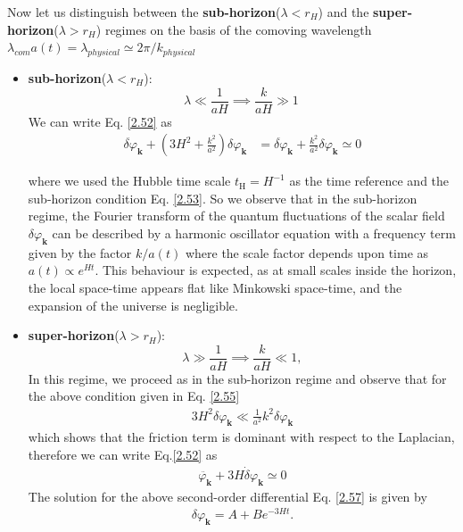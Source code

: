 Now let us distinguish between the \textbf{sub-horizon}($\lambda < r_H$) and the \textbf{super-horizon}($\lambda > r_H$) regimes on the basis of the comoving wavelength $\lambda_{com} a(t) = \lambda_{physical} \simeq 2\pi/k_{physical}$

\begin{itemize}
    \item  \textbf{sub-horizon}($\lambda < r_H$):\\
    \begin{equation}
        \lambda \ll \frac{1}{aH} \implies \frac{k}{aH} \gg 1\ \label{2.53}
    \end{equation}
    We can write Eq. \ref{2.52} as
    \begin{align}
        \ddot{ \delta \varphi} _{\mathbf{k}} + (3 H^2  + \frac{k^2}{a^2}) \delta \varphi _{\mathbf{k}} &=  \ddot{ \delta \varphi} _{\mathbf{k}} + \frac{k^2}{a^2} \delta \varphi _{\mathbf{k}} \simeq 0 \label{2.54}
    \end{align}  
    
    where we used the Hubble time scale \(t_{\mathrm{H}}=H^{-1}\) as the time reference and the sub-horizon condition Eq. \ref{2.53}. So we observe that in the sub-horizon regime, the Fourier transform of the quantum fluctuations of the scalar field $\delta \varphi_{\mathbf{k}}$ can be described by a harmonic oscillator equation with a frequency term given by the factor $k / a(t)$ where the scale factor depends upon time as  \(a(t) \propto e^{Ht}\). This behaviour is expected, as at small scales inside the horizon, the local space-time appears flat like Minkowski space-time, and the expansion of the universe is negligible.
    
     \item  \textbf{super-horizon}($\lambda > r_H$):\\
    \begin{equation}
        \lambda \gg \frac{1}{aH} \implies \frac{k}{aH} \ll 1, \label{2.55}
    \end{equation}
    In this regime, we proceed as in the sub-horizon regime and observe that for the above condition given in Eq. \ref{2.55}
    \begin{align}
       3 H^{2} \delta \varphi_{\mathbf{k}} \ll \frac{1}{a^{2}} k^{2} \delta \varphi_{\mathbf{k}} \label{2.56}
    \end{align}
    which shows that the friction term is dominant with respect to the Laplacian, therefore we can write Eq.\ref{2.52} as
    \begin{align}
        \ddot{ \varphi_{\mathbf{k}}}+3 H \dot{\delta} \varphi_{\mathbf{k}} \simeq 0 \label{2.57}
    \end{align}    
    The solution for the above second-order differential Eq. \ref{2.57} is given by
   \begin{align}
        \delta \varphi_{\mathbf{k}}=A+B e^{-3 H t} .
    \end{align}
    

\end{itemize}
